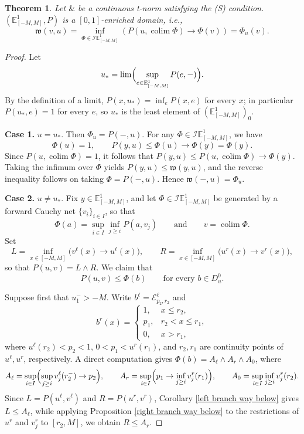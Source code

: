 \documentclass[preprint,3p,times]{elsarticle}
\theoremstyle{plain}
\newtheorem{thm}{Theorem}[section]
\theoremstyle{definition}
\numberwithin{equation}{section}
\begin{document}
\begin{thm} \label{Theorem (S) condition imply a real enriched domain}
	Let \( \& \) be a continuous t-norm satisfying the  (S) condition. \((\mathbb{E}^1_{[-M,M]},P)\) is a \([0,1]\)-enriched domain, i.e.,
	\[
	\mathfrak{w}(v, u) = \inf_{\Phi \in \mathcal{I}\mathbb{E}^1_{[-M,M]}} \left( P(u, \operatorname{colim} \Phi) \to \Phi(v) \right)=\Phi_u(v).
	\]
\end{thm}
\begin{proof}
Let
\[
u_*=\operatorname{lim}\Bigl(\sup_{e\in\mathbb E^1_{[-M,M]}}P(e,-)\Bigr).
\]
By the definition of a limit, \(P(x,u_*)=\inf_{e}P(x,e)\) for every \(x\);
in particular \(P(u_*,e)=1\) for every \(e\), so \(u_*\) is the least
element of \((\mathbb E^1_{[-M,M]})_0\).

\smallskip
\noindent\textbf{Case 1.} \(u=u_*\). Then \(\Phi_u=P(-,u)\). For any
\(\Phi\in\mathcal I\mathbb E^1_{[-M,M]}\), we have
\[
\Phi(u)=1,\qquad
P(y,u)\le\Phi(u)\to\Phi(y)=\Phi(y).
\]
Since \(P(u,\operatorname{colim}\Phi)=1\), it follows that
\(P(y,u)\le P(u,\operatorname{colim}\Phi)\to\Phi(y)\). Taking the infimum
over \(\Phi\) yields \(P(y,u)\le\mathfrak w(y,u)\), and the reverse
inequality follows on taking \(\Phi=P(-,u)\). Hence
\(\mathfrak w(-,u)=\Phi_u\).

\smallskip
\noindent\textbf{Case 2.} \(u\ne u_*\). Fix \(y\in\mathbb E^1_{[-M,M]}\), and
let \(\Phi\in\mathcal I\mathbb E^1_{[-M,M]}\) be generated by a forward
Cauchy net \(\{v_i\}_{i\in I}\), so that
\[
\Phi(a)=\sup_{i\in I}\inf_{j\ge i}P(a,v_j)
\qquad\text{and}\qquad
v=\operatorname{colim}\Phi.
\]
Set
\[
L=\inf_{x\in[-M,M]}\bigl(v^\ell(x)\to u^\ell(x)\bigr),\qquad
R=\inf_{x\in[-M,M]}\bigl(u^r(x)\to v^r(x)\bigr),
\]
so that \(P(u,v)=L\wedge R\). We claim that
\begin{equation}\label{eq:PlePhi}
P(u,v)\le\Phi(b)\qquad\text{for every }b\in D_u^0.
\end{equation}

Suppose first that \(u_1^->-M\). Write \(b^\ell=\mathcal E^\ell_{p_2,r_2}\)
and
\[
b^r(x)=\begin{cases}
1,&x\le r_2,\\
p_1,&r_2<x\le r_1,\\
0,&x>r_1,
\end{cases}
\]
where \(u^\ell(r_2)<p_2<1\), \(0<p_1<u^r(r_1)\), and \(r_2,r_1\) are
continuity points of \(u^\ell,u^r\), respectively. A direct computation
gives \(\Phi(b)=A_\ell\wedge A_r\wedge A_0\), where
\[
A_\ell=\sup_{i\in I}\Bigl(\sup_{j\ge i}v_j^\ell(r_2^-)\to p_2\Bigr),\qquad
A_r=\sup_{i\in I}\Bigl(p_1\to\inf_{j\ge i}v_j^r(r_1)\Bigr),\qquad
A_0=\sup_{i\in I}\inf_{j\ge i}v_j^r(r_2).
\]
Since \(L=P(u^\ell,v^\ell)\) and \(R=P(u^r,v^r)\), Corollary
\ref{left branch way below} gives \(L\le A_\ell\), while applying Proposition \ref{right branch way below} to the restrictions
of \(u^r\) and \(v_j^r\) to \([r_2,M]\), we obtain \(R\le A_r\).


\end{proof}
\end{document}
